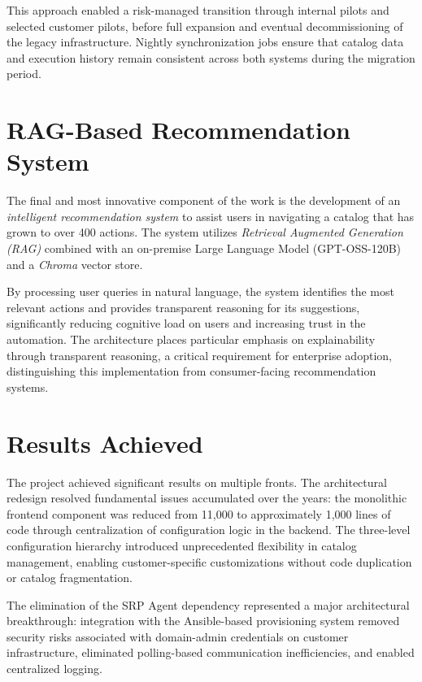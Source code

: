 This approach enabled a risk-managed transition through internal pilots and selected customer pilots, before full expansion and eventual decommissioning of the legacy infrastructure. Nightly synchronization jobs ensure that catalog data and execution history remain consistent across both systems during the migration period.

\section*{\normalsize RAG-Based Recommendation System}

The final and most innovative component of the work is the development of an \textit{intelligent recommendation system} to assist users in navigating a catalog that has grown to over 400 actions. The system utilizes \textit{Retrieval Augmented Generation (RAG)} combined with an on-premise Large Language Model (GPT-OSS-120B) and a \textit{Chroma} vector store.

By processing user queries in natural language, the system identifies the most relevant actions and provides transparent reasoning for its suggestions, significantly reducing cognitive load on users and increasing trust in the automation. The architecture places particular emphasis on explainability through transparent reasoning, a critical requirement for enterprise adoption, distinguishing this implementation from consumer-facing recommendation systems.

\section*{\normalsize Results Achieved}

The project achieved significant results on multiple fronts. The architectural redesign resolved fundamental issues accumulated over the years: the monolithic frontend component was reduced from 11,000 to approximately 1,000 lines of code through centralization of configuration logic in the backend. The three-level configuration hierarchy introduced unprecedented flexibility in catalog management, enabling customer-specific customizations without code duplication or catalog fragmentation.

The elimination of the SRP Agent dependency represented a major architectural breakthrough: integration with the Ansible-based provisioning system removed security risks associated with domain-admin credentials on customer infrastructure, eliminated polling-based communication inefficiencies, and enabled centralized logging.

